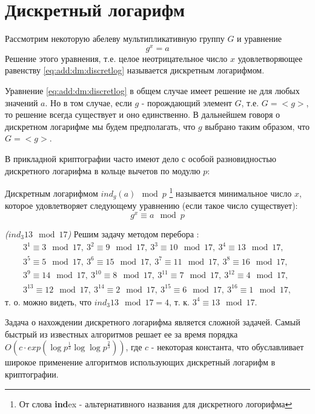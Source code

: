 \section{Дискретный логарифм}
\label{AddDiscretLog}

\begin{definition}
Рассмотрим некоторую абелеву мультипликативную группу $G$ и уравнение 
\begin{equation}
g^x = a
\label{eq:add:dm:discretlog}
\end{equation}
Решение этого уравнения, т.е. целое неотрицательное число $x$
удовлетворяющее равенству \eqref{eq:add:dm:discretlog} называется
дискретным логарифмом.
\end{definition}

Уравнение \eqref{eq:add:dm:discretlog} в общем случае имеет решение не
для любых значений $a$. Но в том случае, если $g$ - порождающий
элемент $G$, т.е. $G=<g>$, то решение всегда существует и оно
единственно. В дальнейшем говоря о дискретном логарифме мы будем
предполагать, что $g$ выбрано таким образом, что $G=<g>$.

В прикладной криптографии часто имеют дело с особой разновидностью
дискретного логарифма в кольце вычетов по модулю $p$:
\begin{definition}
Дискретным логарифмом $ind_g\left(a\right) \mod{p}$
\footnote{От слова {\bf ind}ex - альтернативного названия для дискретного логорифма}
называется
минимальное число $x$, которое удовлетворяет следующему уравнению
(если такое число существует): 
\begin{equation}
g^x \equiv a \mod{p}
\end{equation}
\end{definition}

\begin{example}
\emph{($ind_3{13} \mod{17}$)}
Решим задачу методом перебора \cite{bWikiDiscretLog}:
\begin{eqnarray}
3^1 \equiv 3 \mod{17},\: 
3^2 \equiv 9 \mod{17},\: 
3^3 \equiv 10 \mod{17},\:
3^4 \equiv 13 \mod{17}, 
\nonumber \\
3^5 \equiv 5 \mod{17},\: 
3^6 \equiv 15 \mod{17},\: 
3^7 \equiv 11 \mod{17},\: 
3^8 \equiv 16 \mod{17}, 
\nonumber \\
3^9 \equiv 14 \mod{17},\: 
3^{10} \equiv 8 \mod{17},\: 
3^{11} \equiv 7 \mod{17},\: 
3^{12} \equiv 4 \mod{17}, 
\nonumber \\
3^{13} \equiv 12 \mod{17},\: 
3^{14} \equiv 2 \mod{17},\:
3^{15} \equiv 6 \mod{17},\: 
3^{16} \equiv 1 \mod{17},
\nonumber
\end{eqnarray}
т. о. можно видеть, что $ind_3{13} \mod{17} = 4$, 
т. к. $3^4 \equiv 13 \mod{17}$. 
\nonumber
\end{example}

Задача о нахождении дискретного логарифма является сложной
задачей. Самый быстрый из известных алгоритмов
\cite{bGordon93discretelogarithms} решает ее за время порядка 
\(
O\left(c \cdot
exp\left(\log{p}^{\frac{1}{3}}\log{\log{p}}^{\frac{2}{3}}
\right)\right)
\), где $c$ - некоторая константа,
что обуславливает широкое применение алгоритмов использующих
дискретный логарифм в криптографии.
